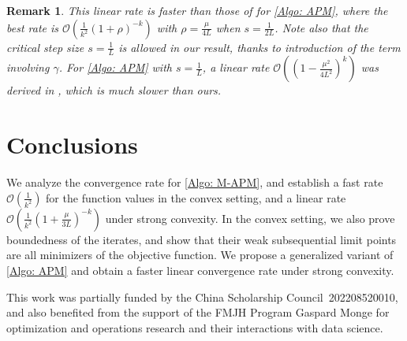 \documentclass[pdflatex,sn-mathphys-num]{sn-jnl}
\theoremstyle{thmstyleone}
\theoremstyle{thmstyletwo}
\newtheorem{remark}{Remark}
\theoremstyle{thmstylethree}
\newenvironment{acknowledgements}{\begin{acknowledgement}}
{\end{acknowledgement}}
\begin{document}
\begin{remark}
This linear rate is faster than those of \cite{Shi_2024,Bao_2023} for \eqref{Algo: APM}, where the best rate is $\mathcal{O}\left( \frac{1}{k^2}(1+\rho)^{-k}\right)$ with $\rho=\frac{\mu}{4L}$ when $s=\frac{1}{2L}$. Note also that the critical step size $s=\frac{1}{L}$ is allowed in our result, thanks to introduction of the term involving $\gamma$. For \eqref{Algo: APM} with $s=\frac{1}{L}$, a linear rate $\mathcal{O}\left( \left(1 - \frac{\mu^2}{4L^2} \right)^{k} \right)$ was derived in \cite{Bao_2023}, which is much slower than ours.   
\end{remark}




\section{Conclusions}\label{Sec: conclusions}
We analyze the convergence rate for \eqref{Algo: M-APM}, and establish a fast rate $\mathcal{O}\left( \frac{1}{k^2} \right)$ for the function values in the convex setting, and a linear rate $\mathcal{O}\left( \frac{1}{k^2}\left( 1 + \frac{\mu}{3L} \right)^{-k} \right)$ under strong convexity. In the convex setting, we also prove boundedness of the iterates, and show that their weak subsequential limit points are all minimizers of the objective function. We propose a generalized variant of \eqref{Algo: APM} and obtain a faster linear convergence rate under strong convexity.









\begin{acknowledgements}
This work was partially funded by the China Scholarship Council~202208520010, and also benefited from the support of the FMJH Program Gaspard Monge for optimization and operations research and their interactions with data science.
\end{acknowledgements}




\end{document}
